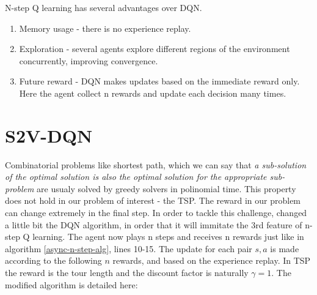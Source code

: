 \documentclass[10pt,a4paper,draft]{article}
\begin{document}
N-step Q learning has several advantages over DQN. 
\begin{enumerate}
	\item Memory usage - there is no experience replay. 
	\item Exploration - several agents explore different regions of the environment concurrently, improving convergence.
	\item Future reward - DQN makes updates based on the immediate reward only. Here the agent collect n rewards and update each decision many times. 
\end{enumerate}

\section{S2V-DQN}
Combinatorial problems like shortest path, which we can say that \textit{a sub-solution of the optimal solution is also the optimal solution for the appropriate sub-problem} are usualy solved by greedy solvers in polinomial time. This property does not hold in our problem of interest - the TSP. The reward in our problem can change extremely in the final step. 
In order to tackle this challenge, \cite{dai17-tsp-s2v} changed a little bit the DQN algorithm, in order that it will immitate the 3rd feature of n-step Q learning. The agent now plays n steps and receives n rewards just like in algorithm \ref{async-n-step-alg}, lines 10-15. The update for each pair $s,a$ is made according to the following $n$ rewards, and based on the experience replay. In TSP the reward is the tour length and the discount factor is naturally $\gamma = 1$. The modified algorithm is detailed here:
\end{document}
